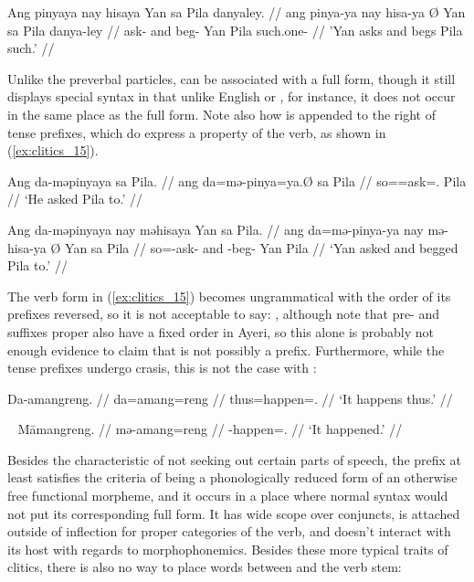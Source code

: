 \ex\label{ex:clitics_14}\begingl
	\gla Ang pinyaya nay hisaya {} Yan sa Pila danyaley. //
	\glb ang pinya-ya nay hisa-ya Ø Yan sa Pila danya-ley //
	\glc \AgtT{} ask-\TsgM{} and beg-\TsgM{} \Top{} Yan \Parg{} Pila
		such.one-\PargI{} //
	\glft 'Yan asks and begs Pila such.' //
\endgl\xe

Unlike the preverbal particles,  can be associated with a full
form, though it still displays special syntax in that unlike English
 or , for instance, it does not occur in the same place as
the full form. Note also how  is appended to the right of tense
prefixes, which do express a property of the verb, as shown in 
(\ref{ex:clitics_15}).

\pex\label{ex:clitics_15}
\a\label{ex:clitics_15a}\begingl
	\gla Ang da-məpinyaya sa Pila. //
	\glb ang da=mə-pinya=ya.Ø sa Pila //
	\glc \AgtT{} so=\Pst{}=ask=\TsgM{}.\Top{} \Parg{} Pila //
	\glft `He asked Pila to.' //
\endgl

\a\label{ex:clitics_15b}\begingl
	\gla Ang da-məpinyaya nay məhisaya {} Yan sa Pila. //
	\glb ang da=mə-pinya-ya nay mə-hisa-ya Ø Yan sa Pila //
	\glc \AgtT{} so=\Pst{}-ask-\TsgM{} and \Pst{}-beg-\TsgM{} \Top{} Yan 
		\Parg{} Pila //
	\glft `Yan asked and begged Pila to.' //
\endgl
\xe

The verb form in (\ref{ex:clitics_15}) becomes ungrammatical with the order of
its prefixes reversed, so it is not acceptable to say: 
, although note that pre- and suffixes proper
also have a fixed order in Ayeri, so this alone is probably not enough evidence
to claim that  is not possibly a prefix. Furthermore, while the
tense prefixes undergo crasis, this is not the case with :

\pex\label{ex:clitics_16}
\a\label{ex:clitics_16a}\begingl
	\gla Da-amangreng. //
	\glb da=amang=reng //
	\glc thus=happen=\TsgI{}.\Aarg{} //
	\glft `It happens thus.' //
\endgl

\a\label{ex:clitics_16b}\ljudge{*} 
\xe

\pex~\label{ex:clitics_17}
\a\label{ex:clitics_17a}\begingl
	\gla Māmangreng. //
	\glb mə-amang=reng //
	\glc \Pst{}-happen=\TsgI{}.\Aarg{} //
	\glft `It happened.' //
\endgl

\a\label{ex:clitics_17b}\ljudge{*} 
\xe

Besides the characteristic of not seeking out certain parts of speech, the 
 prefix at least satisfies the criteria of being a phonologically
reduced form of an otherwise free functional morpheme, and it occurs in a place where normal syntax would not put its corresponding full form. It has wide scope over conjuncts, is attached outside of inflection for proper categories of the verb, and doesn't interact with its host with regards to morphophonemics. Besides these more typical traits of clitics, there is also no way to place words between  and the verb stem:

